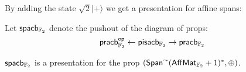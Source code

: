 %
%
By adding the state $\sqrt 2|+\rangle$ we get a presentation for affine spans:
\begin{definition}
Let ${\sf sp}{\sf acb}_{\mathbb{F}_2}$ denote the pushout of the diagram of props:
$$
 {\sf pr}{\sf acb}_{\mathbb{F}_2}^{\mathsf{op}} \leftarrow {\sf pis}{\sf acb}_{\mathbb{F}_2} \rightarrow {\sf pr}{\sf acb}_{\mathbb{F}_2}
$$
\end{definition}
\begin{lemma}
\label{lem:spanaffcb}
${\sf sp}{\sf acb}_{\mathbb{F}_2}$ is a presentation for the prop $(\mathsf{Span}^\sim(\mathsf{Aff}\mathsf{Mat}_{\mathbb{F}_2}+1)^*,\oplus)$.
\end{lemma}
